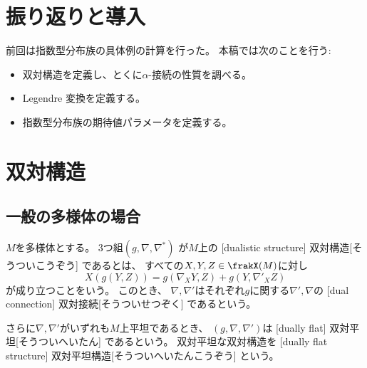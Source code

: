 \documentclass[report]{jlreq}
\begin{document}
%

%
\section*{振り返りと導入}

前回は指数型分布族の具体例の計算を行った。
本稿では次のことを行う:
\begin{itemize}
    \item 双対構造を定義し、とくに$\alpha$-接続の性質を調べる。
    \item Legendre 変換を定義する。
    \item 指数型分布族の期待値パラメータを定義する。
\end{itemize}

%
\section{双対構造}

\subsection{一般の多様体の場合}

\begin{definition}[双対構造]
    $M$を多様体とする。
    3つ組$(g, \nabla, \nabla^*)$
    が$M$上の
    [dualistic structure]
        {双対構造}[そうついこうぞう]
    であるとは、
    すべての$X, Y, Z \in \frakX(M)$に対し
    \begin{equation}
        X(g(Y, Z))
            =
                g(\nabla_X Y, Z) + g(Y, \nabla'_X Z)
    \end{equation}
    が成り立つことをいう。
    このとき、
    $\nabla, \nabla'$はそれぞれ$g$に関する$\nabla', \nabla$の
    [dual connection]
        {双対接続}[そうついせつぞく]
    であるという。

    さらに$\nabla, \nabla'$がいずれも$M$上平坦であるとき、
    $(g, \nabla, \nabla')$は
    [dually flat]
        {双対平坦}[そうついへいたん]
    であるという。
    双対平坦な双対構造を
    [dually flat structure]
        {双対平坦構造}[そうついへいたんこうぞう]
    という。
\end{definition}
\end{document}

